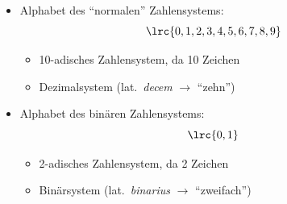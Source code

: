 \begin{frame}
\begin{itemize}\setlength\itemsep{8pt}
    \item Alphabet des \enquote{normalen} Zahlensystems:
    $$\lrc{0,1,2,3,4,5,6,7,8,9}$$
    \begin{itemize}
    \item \textcolor{FDUblue}{10-adisches} Zahlensystem, da 10 Zeichen
    \item \textcolor{FDUteal}{Dezimalsystem} (lat.\ \textit{decem} $\rightarrow$ \enquote{zehn})
    \end{itemize}
    \item Alphabet des binären Zahlensystems:
    $$\lrc{0,1}$$
    \begin{itemize}
    \item \textcolor{FDUblue}{2-adisches} Zahlensystem, da 2 Zeichen
    \item \textcolor{FDUteal}{Binärsystem} (lat.\ \textit{binarius} $\rightarrow$ \enquote{zweifach})
    \end{itemize}
\end{itemize}
\end{frame}

\begin{frame}
\end{frame}

